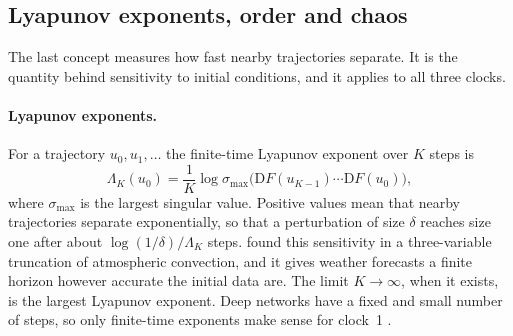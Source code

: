\subsection{Lyapunov exponents, order and chaos}
\label{sec:edgechaos}

The last concept measures how fast nearby trajectories separate. It is the quantity behind sensitivity to initial conditions, and it applies to all three clocks.

\paragraph{Lyapunov exponents.} For a trajectory $u_0,u_1,\dots$ the finite-time Lyapunov exponent over $K$ steps is
\begin{equation}
\Lambda_K(u_0) = \frac{1}{K}\log \sigma_{\max}\big(\mathrm{D}F(u_{K-1})\cdots \mathrm{D}F(u_0)\big),
\label{eq:ftle}
\end{equation}
where $\sigma_{\max}$ is the largest singular value. Positive values mean that nearby trajectories separate exponentially, so that a perturbation of size $\delta$ reaches size one after about $\log(1/\delta)/\Lambda_K$ steps. \citet{lorenz1963deterministic} found this sensitivity in a three-variable truncation of atmospheric convection, and it gives weather forecasts a finite horizon however accurate the initial data are. The limit $K\to\infty$, when it exists, is the largest Lyapunov exponent. Deep networks have a fixed and small number of steps, so only finite-time exponents make sense for clock~1 \citep{storm2023finitetime}.

